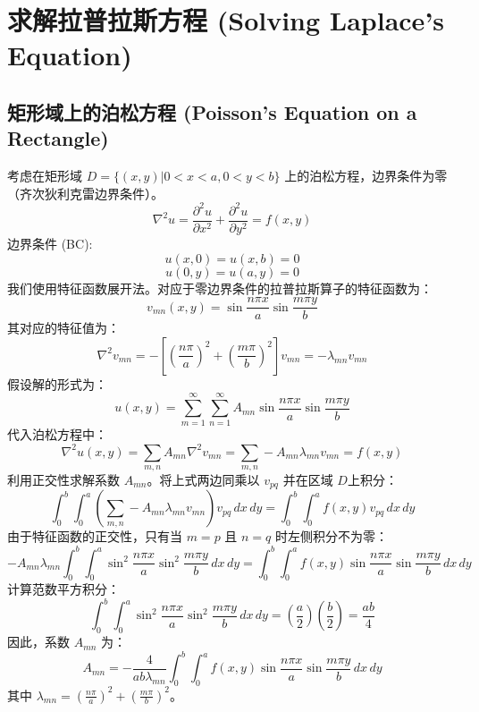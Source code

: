 \documentclass{article}
\begin{document}
	\section{求解拉普拉斯方程 (Solving Laplace's Equation)}
	
	\subsection{矩形域上的泊松方程 (Poisson's Equation on a Rectangle)}
	
	考虑在矩形域 $D = \{(x,y) | 0 < x < a, 0 < y < b\}$ 上的泊松方程，边界条件为零（齐次狄利克雷边界条件）。
	$$ \nabla^2 u = \frac{\partial^2 u}{\partial x^2} + \frac{\partial^2 u}{\partial y^2} = f(x,y) $$
	边界条件 (BC):
	$$ u(x,0) = u(x,b) = 0 $$
	$$ u(0,y) = u(a,y) = 0 $$
	我们使用特征函数展开法。对应于零边界条件的拉普拉斯算子的特征函数为：
	$$ v_{mn}(x,y) = \sin\frac{n\pi x}{a} \sin\frac{m\pi y}{b} $$
	其对应的特征值为：
	$$ \nabla^2 v_{mn} = -\left[ \left(\frac{n\pi}{a}\right)^2 + \left(\frac{m\pi}{b}\right)^2 \right] v_{mn} = -\lambda_{mn} v_{mn} $$
	假设解的形式为：
	$$ u(x,y) = \sum_{m=1}^{\infty} \sum_{n=1}^{\infty} A_{mn} \sin\frac{n\pi x}{a} \sin\frac{m\pi y}{b} $$
	代入泊松方程中：
	$$ \nabla^2 u(x,y) = \sum_{m,n} A_{mn} \nabla^2 v_{mn} = \sum_{m,n} -A_{mn} \lambda_{mn} v_{mn} = f(x,y) $$
	利用正交性求解系数 $A_{mn}$。将上式两边同乘以 $v_{pq}$ 并在区域 $D$上积分：
	$$ \int_0^b \int_0^a \left( \sum_{m,n} -A_{mn} \lambda_{mn} v_{mn} \right) v_{pq} \,dx\,dy = \int_0^b \int_0^a f(x,y) v_{pq} \,dx\,dy $$
	由于特征函数的正交性，只有当 $m=p$ 且 $n=q$ 时左侧积分不为零：
	$$ -A_{mn} \lambda_{mn} \int_0^b \int_0^a \sin^2\frac{n\pi x}{a} \sin^2\frac{m\pi y}{b} \,dx\,dy = \int_0^b \int_0^a f(x,y) \sin\frac{n\pi x}{a} \sin\frac{m\pi y}{b} \,dx\,dy $$
	计算范数平方积分：
	$$ \int_0^b \int_0^a \sin^2\frac{n\pi x}{a} \sin^2\frac{m\pi y}{b} \,dx\,dy = \left(\frac{a}{2}\right) \left(\frac{b}{2}\right) = \frac{ab}{4} $$
	因此，系数 $A_{mn}$ 为：
	$$ A_{mn} = -\frac{4}{ab\lambda_{mn}} \int_0^b \int_0^a f(x,y) \sin\frac{n\pi x}{a} \sin\frac{m\pi y}{b} \,dx\,dy $$
	其中 $\lambda_{mn} = \left(\frac{n\pi}{a}\right)^2 + \left(\frac{m\pi}{b}\right)^2$。
	
\end{document}

